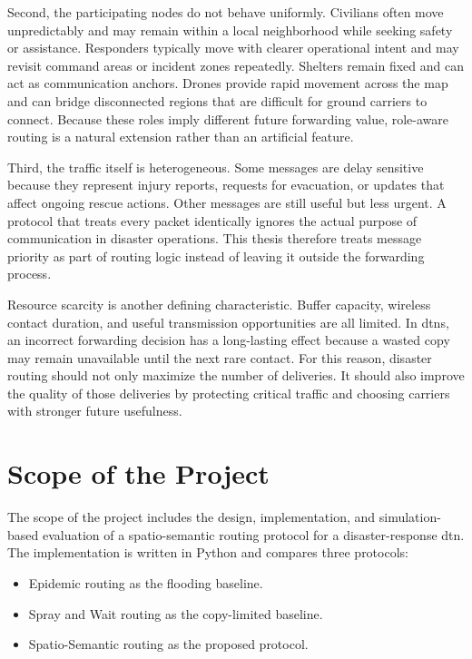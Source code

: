 Second, the participating nodes do not behave uniformly. Civilians often move unpredictably and may remain within a local neighborhood while seeking safety or assistance. Responders typically move with clearer operational intent and may revisit command areas or incident zones repeatedly. Shelters remain fixed and can act as communication anchors. Drones provide rapid movement across the map and can bridge disconnected regions that are difficult for ground carriers to connect. Because these roles imply different future forwarding value, role-aware routing is a natural extension rather than an artificial feature.

Third, the traffic itself is heterogeneous. Some messages are delay sensitive because they represent injury reports, requests for evacuation, or updates that affect ongoing rescue actions. Other messages are still useful but less urgent. A protocol that treats every packet identically ignores the actual purpose of communication in disaster operations. This thesis therefore treats message priority as part of routing logic instead of leaving it outside the forwarding process.

Resource scarcity is another defining characteristic. Buffer capacity, wireless contact duration, and useful transmission opportunities are all limited. In \acp{dtn}, an incorrect forwarding decision has a long-lasting effect because a wasted copy may remain unavailable until the next rare contact. For this reason, disaster routing should not only maximize the number of deliveries. It should also improve the quality of those deliveries by protecting critical traffic and choosing carriers with stronger future usefulness.

\section{Scope of the Project}
The scope of the project includes the design, implementation, and simulation-based evaluation of a spatio-semantic routing protocol for a disaster-response \ac{dtn}. The implementation is written in Python and compares three protocols:

\begin{itemize}
	\item Epidemic routing as the flooding baseline.
	\item Spray and Wait routing as the copy-limited baseline.
	\item Spatio-Semantic routing as the proposed protocol.
\end{itemize}

